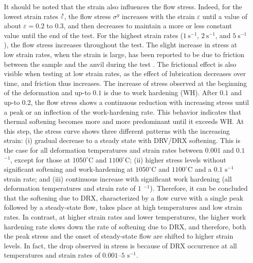 \documentclass[metals,article,submit,pdftex,moreauthors]{Definitions/mdpi}
\DeclareRobustCommand{\mdot}[1]{\accentset{\mbox{\bfseries .}}{#1}}
\DeclareRobustCommand{\ps}{\text{s}^{-1}}
\begin{document}
It should be noted that the strain also influences the flow stress.
Indeed, for the lowest strain rates $\mdot\varepsilon$, the flow stress $\sigma^y$ increases with the strain $\varepsilon$ until a value of about $\varepsilon=0.2$ to $0.3$, and then decreases to maintain a more or less constant value until the end of the test.
For the highest strain rates ($1~\ps$, $2~\ps$, and $5~\ps$), the flow stress increases throughout the test.
The slight increase in stress at low strain rates, when the strain is large, has been reported to be due to friction between the sample and the anvil during the test \cite{galos2022review}.
The frictional effect is also visible when testing at low strain rates, as the effect of lubrication decreases over time, and friction thus increases.
The increase of stress observed at the beginning of the deformation and up-to $0.1$ is due to work hardening (WH).
After $0.1$ and up-to $0.2$, the flow stress shows a continuous reduction with increasing stress until a peak or an inflection of the work-hardening rate.
This behavior indicates that thermal softening becomes more and more predominant until it exceeds WH.
At this step, the stress curve shows three different patterns with the increasing strain: (i) gradual decrease to a steady state with DRV/DRX softening.
This is the case for all deformation temperatures and strain rates between $0.001$ and $0.1$ $^{-1}$, except for those at $1050^\circ$C and $1100^\circ$C; (ii) higher stress levels without significant softening and work-hardening at $1050^\circ$C and $1100^\circ$C and a $0.1$ $\text{s}^{-1}$ strain rate; and (iii) continuous increase with significant work hardening (all deformation temperatures and strain rate of $1$ $^{-1}$).
Therefore, it can be concluded that the softening due to DRX, characterized by a flow curve with a single peak followed by a steady-state flow, takes place at high temperatures and low strain rates.
In contrast, at higher strain rates and lower temperatures, the higher work hardening rate slows down the rate of softening due to DRX, and therefore, both the peak stress and the onset of steady-state flow are shifted to higher strain levels.
In fact, the drop observed in
stress is because of DRX occurrence at all temperatures and strain rates of $0.001$–$5$ $\text{s}^{-1}$.
\end{document}
